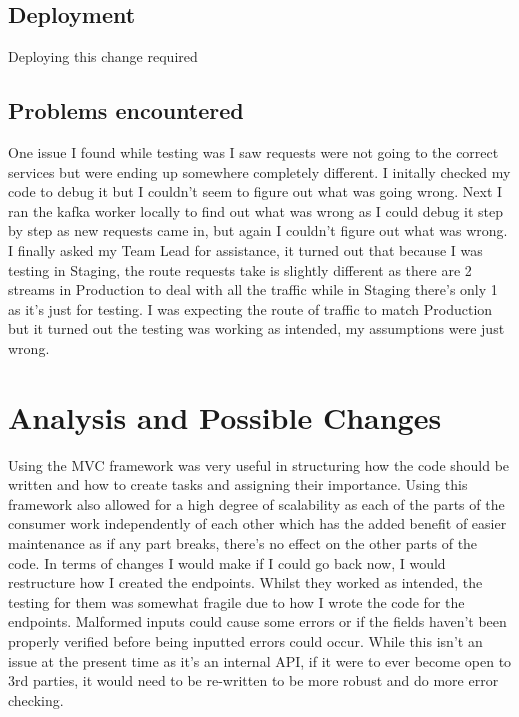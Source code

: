 \subsection{Deployment}
Deploying this change required 

\subsection{Problems encountered}
One issue I found while testing was I saw requests were not going to the correct services but were ending up somewhere completely different.  I initally checked my code to debug it but I couldn't seem to figure out what was going wrong.  Next I ran the kafka worker locally to find out what was wrong as I could debug it step by step as new requests came in, but again I couldn't figure out what was wrong.  I finally asked my Team Lead for assistance,  it turned out that because I was testing in Staging,  the route requests take is slightly different as there are 2 streams in Production to deal with all the traffic while in Staging there's only 1 as it's just for testing.  I was expecting the route of traffic to match Production but it turned out the testing was working as intended,  my assumptions were just wrong. 

\section{Analysis and Possible Changes}
Using the MVC framework was very useful in structuring how the code should be written and how to create tasks and assigning their importance.  Using this framework also allowed for a high degree of scalability as each of the parts of the consumer work independently of each other which has the added benefit of easier maintenance as if any part breaks, there's no effect on the other parts of the code.  \newline In terms of changes I would make if I could go back now, I would restructure how I created the endpoints.  Whilst they worked as intended, the testing for them was somewhat fragile due to how I wrote the code for the endpoints.  Malformed inputs could cause some errors or if the fields haven't been properly verified before being inputted errors could occur.  While this isn't an issue at the present time as it's an internal API,  if it were to ever become open to 3rd parties,  it would need to be re-written to be more robust and do more error checking.